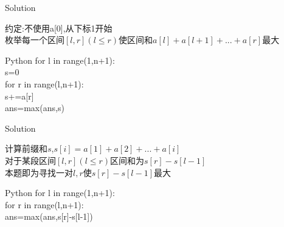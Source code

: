 \documentclass[aspectratio=169,xcolor=dvipsnames]{beamer}
\begin{document}
\begin{frame}{Solution}

    约定:不使用a[0],从下标1开始\\

    枚举每一个区间$[l,r](l \le r)$使区间和$a[l]+a[l+1]+...+a[r]$最大\\
    \begin{block}{Python}
        for l in range(1,n+1):\\
        \quad s=0\\
        \quad for r in range(l,n+1):\\
        \quad \quad s+=a[r]\\
        \quad \quad ans=max(ans,s)\\
    \end{block}

\end{frame}

\begin{frame}{Solution}

    计算前缀和$s$,$s[i]=a[1]+a[2]+...+a[i]$\\
    对于某段区间$[l,r](l \le r)$区间和为$s[r]-s[l-1]$\\
    本题即为寻找一对$l,r$使$s[r]-s[l-1]$最大


    \begin{block}{Python}
        for l in range(1,n+1):\\
        \quad for r in range(l,n+1):\\
        \quad \quad ans=max(ans,s[r]-s[l-1])\\
    \end{block}
\end{frame}
\end{document}
